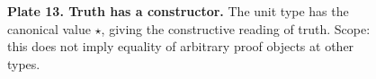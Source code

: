 \begin{figure}[p]\centering{}\caption{\textbf{Plate 13. Truth has a constructor.} The unit type has the canonical value $\star$, giving the constructive reading of truth. Scope: this does not imply equality of arbitrary proof objects at other types.}\label{plate:unit-constructor}\end{figure}
